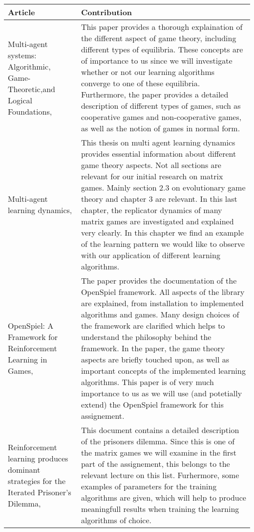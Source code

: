 \documentclass[10pt,a4paper]{article}
\begin{document}
\bigskip
\begin{longtable}{|p{4cm}|p{9cm}|}
\hline 
Article & Contribution \\ 
\hline 
\hline
Multi-agent systems: Algorithmic, Game-Theoretic,and Logical Foundations, \citet{mas} & This paper provides a thorough explaination of the different aspect of game theory, including different types of equilibria. These concepts are of importance to us since we will investigate whether or not our learning algorithms converge to one of these equilibria. Furthermore, the paper provides a detailed description of different types of games, such as cooperative games and non-cooperative games, as well as the notion of games in normal form.   \\ 
\hline 
Multi-agent learning dynamics, \citet{phdthesis} &  This thesis on multi agent learning dynamics provides essential information about different game theory aspects. Not all sections are relevant for our initial research on matrix games. Mainly section 2.3 on evolutionary game theory and chapter 3 are relevant. In this last chapter, the replicator dynamics of many matrix games are investigated and explained very clearly. In this chapter we find an example of the learning pattern we would like to observe with our application of different learning algorithms.   \\
\hline 
OpenSpiel: A Framework for Reinforcement Learning in Games, \citet{lanctot2019openspiel} & The paper provides the documentation of the OpenSpiel framework. All aspects of the library are explained, from installation to implemented algorithms and games. Many design choices of the framework are clarified which helps to understand the philosophy behind the framework. In the paper, the game theory aspects are briefly touched upon, as well as important concepts of the implemented learning algorithms. This paper is of very much importance to us as we will use (and potetially extend) the OpenSpiel framework for this assignement. \\ 
\hline  
Reinforcement learning produces dominant strategies for the Iterated Prisoner’s Dilemma, \citet{rlforpd} & 
This document contains a detailed description of the prisoners dilemma. Since this is one of the matrix games we will examine in the first part of the assignement, this belongs to the relevant lecture on this list. Furhermore, some examples of parameters for the training algorithms are given, which will help to produce meaningfull results when training the learning algorithms of choice.\\ 

\end{longtable}
\end{document}
